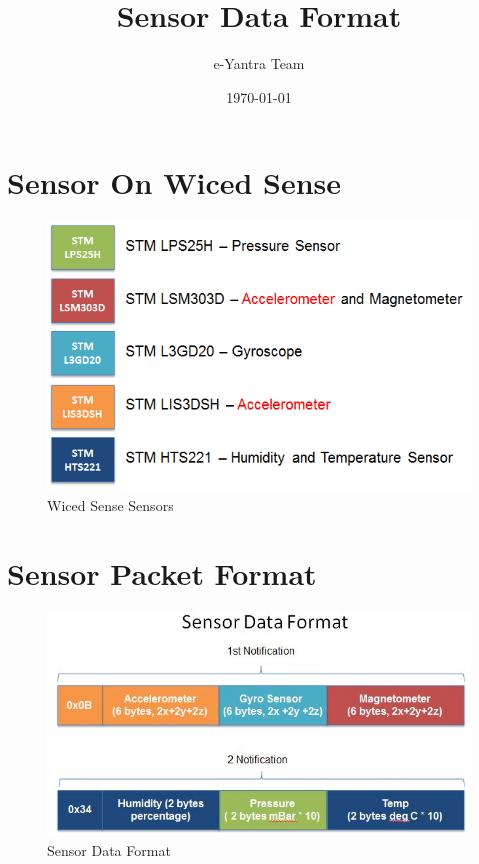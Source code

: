 \documentclass[11pt,a4paper]{article}
\begin{document}
\begin{titlepage}
\title{Sensor Data Format}
\author{e-Yantra Team}
\date{\today}
\maketitle
\end{titlepage}

\newpage
	\section{Sensor On Wiced Sense}
	
	
	\begin{figure}[h]
    \centering
	\includegraphics[scale=0.5]{Sensors.png}
		\caption{Wiced Sense Sensors}
	\end{figure}

\section{Sensor Packet Format}

\begin{figure}[h]
    \centering
	\includegraphics[scale=0.7]{PacketFormat.JPG}
		\caption{Sensor Data Format}
	\end{figure}
\end{document}
